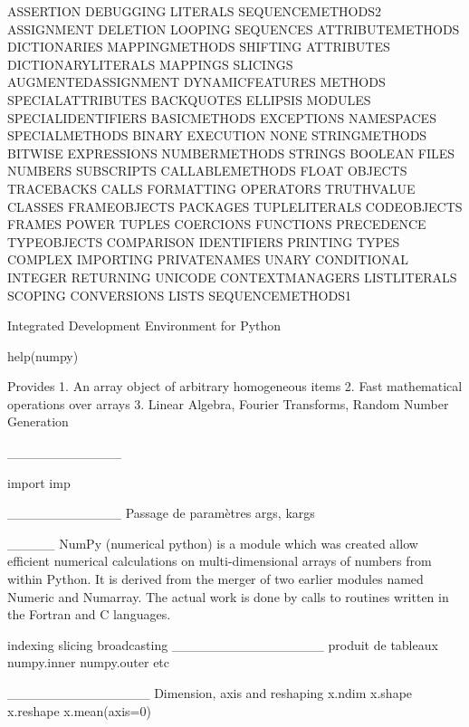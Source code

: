 ASSERTION           DEBUGGING           LITERALS            SEQUENCEMETHODS2
ASSIGNMENT          DELETION            LOOPING             SEQUENCES
ATTRIBUTEMETHODS    DICTIONARIES        MAPPINGMETHODS      SHIFTING
ATTRIBUTES          DICTIONARYLITERALS  MAPPINGS            SLICINGS
AUGMENTEDASSIGNMENT DYNAMICFEATURES     METHODS             SPECIALATTRIBUTES
BACKQUOTES          ELLIPSIS            MODULES             SPECIALIDENTIFIERS
BASICMETHODS        EXCEPTIONS          NAMESPACES          SPECIALMETHODS
BINARY              EXECUTION           NONE                STRINGMETHODS
BITWISE             EXPRESSIONS         NUMBERMETHODS       STRINGS
BOOLEAN             FILES               NUMBERS             SUBSCRIPTS
CALLABLEMETHODS     FLOAT               OBJECTS             TRACEBACKS
CALLS               FORMATTING          OPERATORS           TRUTHVALUE
CLASSES             FRAMEOBJECTS        PACKAGES            TUPLELITERALS
CODEOBJECTS         FRAMES              POWER               TUPLES
COERCIONS           FUNCTIONS           PRECEDENCE          TYPEOBJECTS
COMPARISON          IDENTIFIERS         PRINTING            TYPES
COMPLEX             IMPORTING           PRIVATENAMES        UNARY
CONDITIONAL         INTEGER             RETURNING           UNICODE
CONTEXTMANAGERS     LISTLITERALS        SCOPING             
CONVERSIONS         LISTS               SEQUENCEMETHODS1    



Integrated Development Environment for Python


help(numpy)

    Provides
      1. An array object of arbitrary homogeneous items
      2. Fast mathematical operations over arrays
      3. Linear Algebra, Fourier Transforms, Random Number Generation
      
____________

import imp     

____________
Passage de paramètres
args, kargs

_____
NumPy (numerical python) is a module which was created allow efficient numerical calculations on multi-dimensional arrays of numbers from within Python. It is derived from the merger of two earlier modules named Numeric and Numarray. The actual work is done by calls to routines written in the Fortran and C languages.

indexing
slicing
broadcasting
________________
produit de tableaux
numpy.inner
numpy.outer
etc

_______________
Dimension, axis and reshaping
x.ndim
x.shape
x.reshape
x.mean(axis=0)

